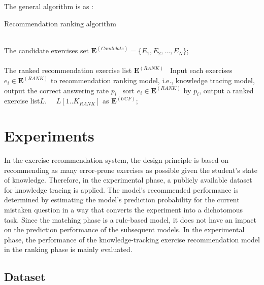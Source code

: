 The general algorithm is as \algoname{\ref{alg:ch4-Rank}}:
\begin{algorithm}[htbp!]
    \caption{Recommendation ranking algorithm}\label{alg:ch4-Rank}
    \begin{algorithmic}
        \REQUIRE~~\\
        The candidate exercises set \(\mathbf{E}^{(Candidate)}=\{E_1,E_2,\ldots,E_N\} \); \\
        \ENSURE~~\\ %
        The ranked recommendation exercise list \(\mathbf{E}^{(RANK)} \)
        \STATE~Input each exercises \(e_i \in \mathbf{E}^{(RANK)} \) to recommendation ranking model, i.e., knowledge tracing model, output the correct answering rate \(p_i\)
        \STATE~sort \(e_i \in \mathbf{E}^{(RANK)} \) by \(p_i\), output a ranked exercise list\(L\).
        \RETURN~~\(L[1..K_{RANK}]\) as \(\mathbf{E}^{(UCF)} \); %
    \end{algorithmic}
\end{algorithm}

\section{Experiments}
In the exercise recommendation system, the design principle is based on recommending as many error-prone exercises as possible given the student's state of knowledge. Therefore, in the experimental phase, a publicly available dataset for knowledge tracing is applied. The model's recommended performance is determined by estimating the model's prediction probability for the current mistaken question in a way that converts the experiment into a dichotomous task. Since the matching phase is a rule-based model, it does not have an impact on the prediction performance of the subsequent models. In the experimental phase, the performance of the knowledge-tracking exercise recommendation model in the ranking phase is mainly evaluated.

\subsection{Dataset}


